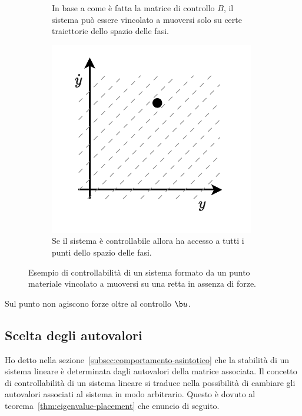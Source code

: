 \begin{example}
\begin{figure}[H]
\begin{subfigure}[t]{0.30\textwidth}
            \caption{In base a come è fatta la matrice di controllo $B$, il sistema può
            essere vincolato a muoversi solo su certe traiettorie dello spazio delle fasi.}
            \label{fig:ex-uncontrollable}
        \end{subfigure}
        \hfill
        \begin{subfigure}[t]{0.30\textwidth}
                  \centering
                  \includegraphics[width=\textwidth]{assets/ex-pianocartesiano-controllable}
                  \caption{Se il sistema è controllabile allora ha accesso a
                  tutti i punti dello spazio delle fasi.}
            \label{fig:ex-controllable}
        \end{subfigure}

        \caption[Punto materiale su una retta]{Esempio di controllabilità di
        un sistema formato da un punto materiale vincolato a muoversi su una retta
        in assenza di forze.}%
    \end{figure}


    Sul punto non agiscono forze oltre al controllo $\b u$.
    \label{ex:controllabilità}
\end{example}

\subsection{Scelta degli autovalori}
\label{subsec:scelta-autovalori}
Ho detto nella sezione~\ref{subsec:comportamento-asintotico} che la stabilità
di un sistema lineare è determinata dagli autovalori della matrice associata.
Il concetto di controllabilità di un sistema lineare si traduce nella possibilità
di cambiare gli autovalori associati al sistema in modo arbitrario.
Questo è dovuto al teorema~\ref{thm:eigenvalue-placement} che enuncio di seguito.

